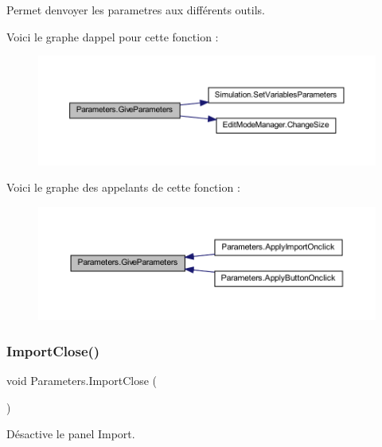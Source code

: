Permet d\textquotesingle{}envoyer les parametres aux différents outils. 

Voici le graphe d\textquotesingle{}appel pour cette fonction \+:
\nopagebreak
\begin{figure}[H]
\begin{center}
\leavevmode
\includegraphics[width=350pt]{class_parameters_abc57bdbb6a4e2f78c7d71f1fa26b5fe8_cgraph}
\end{center}
\end{figure}
Voici le graphe des appelants de cette fonction \+:
\nopagebreak
\begin{figure}[H]
\begin{center}
\leavevmode
\includegraphics[width=350pt]{class_parameters_abc57bdbb6a4e2f78c7d71f1fa26b5fe8_icgraph}
\end{center}
\end{figure}
\mbox{\label{class_parameters_a95a34ed3f54953655b8caf704caff1f5}} 
\subsubsection{\texorpdfstring{Import\+Close()}{ImportClose()}}
{\footnotesize\ttfamily void Parameters.\+Import\+Close (\begin{DoxyParamCaption}{ }\end{DoxyParamCaption})\hspace{0.3cm}{\ttfamily [inline]}}



Désactive le panel Import. 

